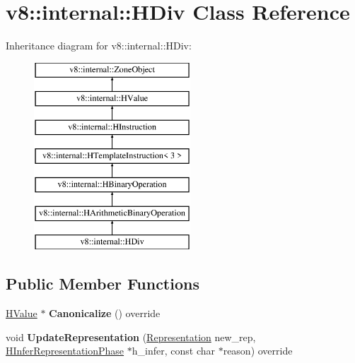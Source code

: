 \hypertarget{classv8_1_1internal_1_1_h_div}{}\section{v8\+:\+:internal\+:\+:H\+Div Class Reference}
\label{classv8_1_1internal_1_1_h_div}
Inheritance diagram for v8\+:\+:internal\+:\+:H\+Div\+:\begin{figure}[H]
\begin{center}
\leavevmode
\includegraphics[height=7.000000cm]{classv8_1_1internal_1_1_h_div}
\end{center}
\end{figure}
\subsection*{Public Member Functions}
\begin{DoxyCompactItemize}
\item 
\hyperlink{classv8_1_1internal_1_1_h_value}{H\+Value} $\ast$ {\bfseries Canonicalize} () override\hypertarget{classv8_1_1internal_1_1_h_div_a273c9153a3358165b18e744429728475}{}\label{classv8_1_1internal_1_1_h_div_a273c9153a3358165b18e744429728475}

\item 
void {\bfseries Update\+Representation} (\hyperlink{classv8_1_1internal_1_1_representation}{Representation} new\+\_\+rep, \hyperlink{classv8_1_1internal_1_1_h_infer_representation_phase}{H\+Infer\+Representation\+Phase} $\ast$h\+\_\+infer, const char $\ast$reason) override\hypertarget{classv8_1_1internal_1_1_h_div_aa33fd72473c6717b9bb8319a1d7b7bb3}{}\label{classv8_1_1internal_1_1_h_div_aa33fd72473c6717b9bb8319a1d7b7bb3}

\end{DoxyCompactItemize}
